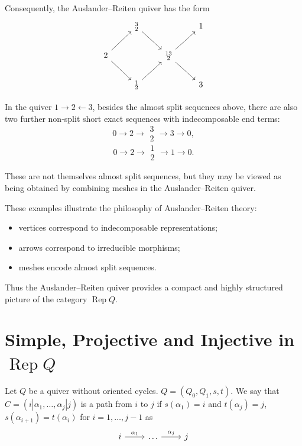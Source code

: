 \documentclass[11pt, a4paper]{report}
\begin{document}
Consequently, the Auslander--Reiten quiver has the form
\[
    \begin{tikzcd}
        & \substack{3 \\ 2} \arrow[rd] &                                          & 1 \\
        2 \arrow[ru] \arrow[rd] &                              & \substack{13 \\ 2} \arrow[ru] \arrow[rd] &   \\
        & \substack{1 \\ 2} \arrow[ru] &                                          & 3
    \end{tikzcd}
\]

In the quiver $1\to 2 \leftarrow 3$, besides the almost split sequences above, there
are also two further non-split short exact sequences with indecomposable end terms:
\[
    0 \longrightarrow 2 \longrightarrow \substack{3 \\ 2} \longrightarrow 3 \longrightarrow 0,
\]
\[
    0 \longrightarrow 2 \longrightarrow \substack{1 \\ 2} \longrightarrow 1 \longrightarrow 0.
\]

These are not themselves almost split sequences, but they may be viewed as being
obtained by combining meshes in the Auslander--Reiten quiver.

These examples illustrate the philosophy of Auslander--Reiten theory:

\begin{itemize}
    \item vertices correspond to indecomposable representations;
    \item arrows correspond to irreducible morphisms;
    \item meshes encode almost split sequences.
\end{itemize}

Thus the Auslander--Reiten quiver provides a compact and highly structured picture
of the category $\operatorname{Rep}Q$.

\section{Simple, Projective and Injective in \texorpdfstring{$\operatorname{Rep}Q$}{Rep Q}}

\begin{definition}
    Let $Q$ be a quiver without oriented cycles. $Q=(Q_0,Q_1,s,t)$. We say that $C=(i | \alpha_1 , \ldots, \alpha_j |j)$ is a path from $i$ to $j$ if $s(\alpha_1)=i$ and $t(\alpha_j)=j$, $s(\alpha_{i+1})=t(\alpha_i)$ for $i=1, \ldots, j-1$ as
    \[
        \begin{tikzcd}
            i \arrow[r, "\alpha_1"] & \ldots \arrow[r, "\alpha_j"] & j
        \end{tikzcd}
    \]
\end{definition}
\end{document}
